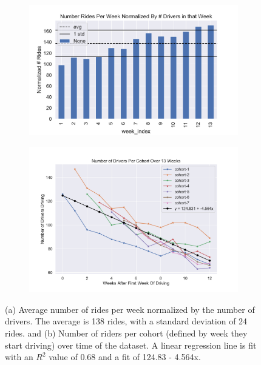 \documentclass{report}
\begin{document}
		\begin{figure}[!htb]
			\centering
			\begin{subfigure}[t]{0.49\textwidth}
			\includegraphics[width=\linewidth]{timefactor_analysis/avg_number_rides_perweek.pdf}
			\caption{}
			\label{fig:avg_rides_perweek}
			\end{subfigure}
			\centering
			\begin{subfigure}[t]{0.49\textwidth}
			\includegraphics[width=\linewidth]{cohort_analysis_apl/cohort_over_time.pdf}
			\caption{}
			\label{fig:driver_cohort_over_time}
			\end{subfigure}
			\caption{(a) Average number of rides per week normalized by the number of drivers. The average is 138 rides, with a standard deviation of 24 rides. and (b) Number of riders per cohort (defined by week they start driving) over time of the dataset. A linear regression line is fit with an $R^2$ value of 0.68 and a fit of 124.83 - 4.564x.}
		\end{figure} 
\end{document}
